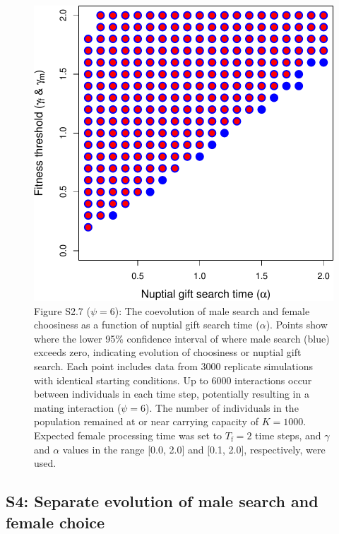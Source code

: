 \documentclass[
]{article}
\begin{document}
\begin{figure}
\centering
\includegraphics{SI_files/figure-latex/unnamed-chunk-8-1.pdf}
\caption{Figure S2.7 (\(\psi = 6\)): The coevolution of male search and
female choosiness as a function of nuptial gift search time
(\(\alpha\)). Points show where the lower 95\% confidence interval of
where male search (blue) exceeds zero, indicating evolution of
choosiness or nuptial gift search. Each point includes data from 3000
replicate simulations with identical starting conditions. Up to 6000
interactions occur between individuals in each time step, potentially
resulting in a mating interaction (\(\psi = 6\)). The number of
individuals in the population remained at or near carrying capacity of
\(K = 1000\). Expected female processing time was set to
\(T_{\mathrm{f}}=2\) time steps, and \(\gamma\) and \(\alpha\) values in
the range {[}0.0, 2.0{]} and {[}0.1, 2.0{]}, respectively, were used.}
\end{figure}

\captionsetup{labelformat=default}

\clearpage

\hypertarget{s4-separate-evolution-of-male-search-and-female-choice}{%
\subsection{S4: Separate evolution of male search and female
choice}\label{s4-separate-evolution-of-male-search-and-female-choice}}
\end{document}
